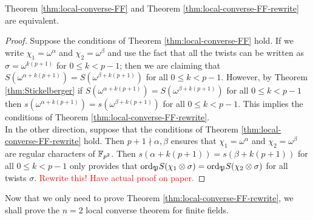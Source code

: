 \begin{prop}
Theorem \ref{thm:local-converse-FF} and Theorem \ref{thm:local-converse-FF-rewrite} are equivalent.
\end{prop}

\begin{proof}
Suppose the conditions of Theorem \ref{thm:local-converse-FF} hold. 
If we write $\chi_1 = \omega^\alpha$ and $\chi_2 = \omega^\beta$ and use the fact that all the twists can be written as $\sigma = \omega^{k (p+1)}$ for $0 \leq k < p-1$; then we are claiming that $S(\omega^{\alpha + k(p+1)}) = S(\omega^{\beta+k(p+1)})$ for all $0 \leq k < p-1$. 
However, by Theorem \ref{thm:Stickelberger} if $S(\omega^{\alpha + k(p+1)}) = S(\omega^{\beta+k(p+1)})$ for all $0 \leq k < p-1$ then $s(\omega^{\alpha + k(p+1)}) = s(\omega^{\beta+k(p+1)})$ for all $0 \leq k < p-1$. 
This implies the conditions of Theorem \ref{thm:local-converse-FF-rewrite}.
\\

In the other direction, suppose that the conditions of Theorem \ref{thm:local-converse-FF-rewrite} hold. 
Then $p+1 \nmid \alpha, \beta$ ensures that $\chi_1 = \omega^\alpha$ and $\chi_2 = \omega^\beta$ are regular characters of $\mathbb{F}_{p^2}$. Then $s(\alpha + k(p+1)) = s(\beta + k(p+1))$ for all $0 \leq k < p-1$ only provides that $\textrm{ord}_{\mathfrak{P}} S(\chi_1 \otimes \sigma) = \textrm{ord}_{\mathfrak{P}} S(\chi_2 \otimes \sigma)$ for all twists $\sigma$. \textcolor{red}{Rewrite this! Have actual proof on paper.}

\end{proof}

Now that we only need to prove Theorem \ref{thm:local-converse-FF-rewrite}, we shall prove the $n=2$ local converse theorem for finite fields.

